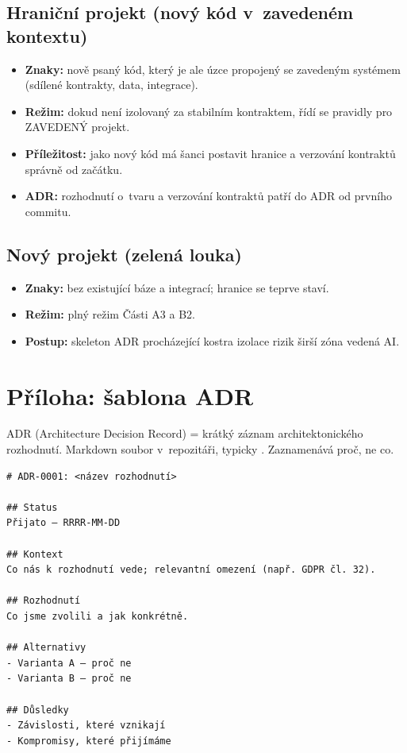 \subsection{Hraniční projekt (nový kód v~zavedeném kontextu)}

\begin{itemize}
\item \textbf{Znaky:} nově psaný kód, který je ale úzce propojený se zavedeným systémem (sdílené kontrakty, data, integrace).
\item \textbf{Režim:} dokud není izolovaný za stabilním kontraktem, řídí se pravidly pro ZAVEDENÝ projekt.
\item \textbf{Příležitost:} jako nový kód má šanci postavit hranice a verzování kontraktů správně od začátku.
\item \textbf{ADR:} rozhodnutí o~tvaru a verzování kontraktů patří do ADR od prvního commitu.
\end{itemize}

\subsection{Nový projekt (zelená louka)}

\begin{itemize}
\item \textbf{Znaky:} bez existující báze a integrací; hranice se teprve staví.
\item \textbf{Režim:} plný režim Části A3 a B2.
\item \textbf{Postup:} skeleton \then{} ADR \then{} procházející kostra \then{} izolace rizik \then{} širší zóna vedená AI.
\end{itemize}

\section{Příloha: šablona ADR}

ADR (Architecture Decision Record) = krátký záznam architektonického rozhodnutí.
Markdown soubor v~repozitáři, typicky .
Zaznamenává proč, ne co.

\begin{tcolorbox}[colback=black!3,colframe=black!20,boxrule=0.4pt,arc=1pt,
  left=8pt,right=8pt,top=6pt,bottom=6pt,fontupper=\ttfamily\small]
\begin{verbatim}
# ADR-0001: <název rozhodnutí>

## Status
Přijato — RRRR-MM-DD

## Kontext
Co nás k rozhodnutí vede; relevantní omezení (např. GDPR čl. 32).

## Rozhodnutí
Co jsme zvolili a jak konkrétně.

## Alternativy
- Varianta A — proč ne
- Varianta B — proč ne

## Důsledky
- Závislosti, které vznikají
- Kompromisy, které přijímáme
\end{verbatim}
\end{tcolorbox}

